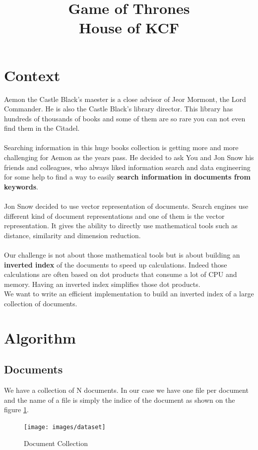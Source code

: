 \documentclass[12pt,french,titlepage]{article}
\title{\textbf{Game of Thrones} \\ House of KCF}
\date{\vspace{-35ex}}
\begin{document}
\maketitle

\section{Context}
Aemon the Castle Black's maester is a close advisor of Jeor Mormont, the Lord Commander. He is also the Castle Black's library director. This library has hundreds of thousands of books and some of them are so rare you can not even find them in the Citadel. 
\\\\
Searching information in this huge books collection is getting more and more challenging for Aemon as the years pass. He decided to ask You and Jon Snow his friends and colleagues, who always liked information search and data engineering for some help to find a way to easily \textbf{search information in documents from keywords}.
\\\\
Jon Snow decided to use vector representation of documents. Search engines use different kind of document representations and one of them is the vector representation. It gives the ability to directly use mathematical tools such as distance, similarity and dimension reduction.
\\\\
Our challenge is not about those mathematical tools but is about building an \textbf{inverted index} of the documents to speed up calculations. Indeed those calculations are often based on dot products that consume a lot of CPU and memory. Having an inverted index simplifies those dot products.
\\
We want to write an efficient implementation to build an inverted index of a large collection of documents.

\section{Algorithm}
\subsection{Documents}
We have a collection of N documents. In our case we have one file per document and the name of a file is simply the indice of the document as shown on the figure \ref{fig:documents}.
\begin{figure}[H]
    \centering
    \texttt{[image: images/dataset]}
    \caption{Document Collection}
    \label{fig:documents}
\end{figure}
\end{document}
